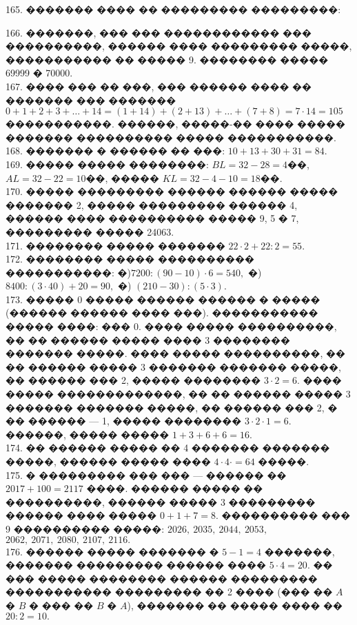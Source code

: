\documentclass[12pt]{article}
\begin{document}
165. ������� ���� �� ��������� ���������:
\begin{center}
\begin{figure}[ht!]
\end{figure}
\end{center}
166. �������, ��� ��� ������������ ��� ����������, ������ ���� ��������� �����, ����������� �� ����� 9. �������� ����� 69999 � 70000.\\
167. ���� ��� �� ���, ��� ������ ���� �� ������� ��� ������� $0+1+2+3+\ldots+14=(1+14)+(2+13)+\ldots+(7+8)=7\cdot14=105$ �����������. ������, �����-�� ���� ����� ������� ���������� ����� �����������.\\
168. ������� � ������ �� ���: $10+13+30+31=84.$\\
169. ����� ����� ��������: $BL=32-28=4$��, $AL=32-22=10$��, ����� $KL=32-4-10=18$��.\\
170. ����� ��������� ������ ������ ����� ������� 2, ����� ��������� ������ 4, ������ ���� ���������� ����� 9, 5 � 7, ��������� ����� 24063.\\
171. �������� ����� ������� $22\cdot2+22:2=55.$\\
172. �������� ����� ���������� �����������: �)$7200:(90-10)\cdot6=540,$ �) $8400:(3\cdot40)+20=90,$ �) $(210-30):(5\cdot3).$\\
173. ����� 0 ����� ������ ������ � ����� (������ ������ ���� ���). ����������� ����� ����: ��� 0. ���� ����� ����������, �� �� ������ ����� ���� 3 �������� ������� �����. ���� ����� ����������, �� �� ������ ����� 3 ������� ������� �����, �� ������ ��� 2, ����� �������� $3\cdot2=6.$ ���� ����� �������������, �� �� ������ ����� 3 ������� ������� �����, �� ������ ��� 2, � �� ������ --- 1, ����� �������� $3\cdot2\cdot1=6.$ ������, ����� ����� $1+3+6+6=16.$\\
174. �� ������ ����� �� 4 ������� ������� �����, ������ ����� ���� $4\cdot4\cdot=64$ �����.\\
175. � ��������� ��� ��� --- ������ �� $2017+100=2117$ ����. ������ ����� �� ����������, ������ ����� 3 ��������� ������ ���� ����� $0+1+7=8.$ ���������� ��� 9 ���������� �����: $2026,\ 2035,\ 2044,\ 2053,$\\$2062,\ 2071,\ 2080,\ 2107,\ 2116.$\\
176. ������ ����� ������� � $5-1=4$ �������, ������� ��������� ������ ���� $5\cdot4=20.$ �� ��� ����� �������� ������ ��������� ����������� ��������� �� 2 ���� (��� �� $A$ � $B$ � ��� �� $B$ � $A$), ������� �� ����� ���� �� $20:2=10.$\\
\end{document}
